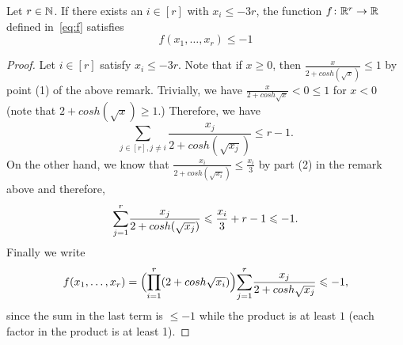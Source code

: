 \begin{lemma}
  \label{lem:special:function:2} %
  \leanok
  Let $r \in \mathbb{N}$. If there exists an $i \in [r]$ with $x_i \le - 3r$, the function $f \colon \mathbb{R}^r \rightarrow \mathbb{R}$ defined in~\eqref{eq:f} satisfies $$f(x_1,\dots,x_r) \le -1$$
\end{lemma}
%
\begin{proof}
  Let $i \in [r]$ satisfy $x_i \leq -3r$. Note that if $x\geq 0$, then $\frac{x}{2+cosh(\sqrt{x})}\leq 1$ by point (1) of the above remark.
  Trivially, we have $\frac{x}{2+cosh{\sqrt{x}}}<0\leq 1$ for $x<0$ (note that $2+cosh(\sqrt{x})\geq 1$.)
  Therefore, we have 
  \begin{equation*}
    \underset{j \in [r], j \neq i}{\sum} \frac{x_j}{2+cosh(\sqrt{x_j})} \leq r-1.
  \end{equation*}
  On the other hand, we know that $\frac{x_i}{2+cosh(\sqrt{x_i})} \leq \frac{x_i}{3}$ by part (2) in the remark above and therefore,
  \begin{equation*}
    \overunderset{r}{j=1}{\sum}\frac{x_j}{2+cosh(\sqrt{x_j})}\leq \frac{x_i}{3}+r-1\leq -1.
  \end{equation*}
  Finally we write 
  \begin{equation*}
    f(x_1,\dots,x_r) = \Bigl(\overunderset{r}{i=1}{\prod}(2+cosh\sqrt{x_i})\Bigr)\overunderset{r}{j=1}{\sum}\frac{x_j}{2+cosh \sqrt{x_j}} \leq -1,
  \end{equation*}
  since the sum in the last term is $\leq -1$ while the product is at least $1$ (each factor in the product is at least 1).
\end{proof}



\begin{lemma}
  \label{lem:fubini-finite}
\end{lemma}


